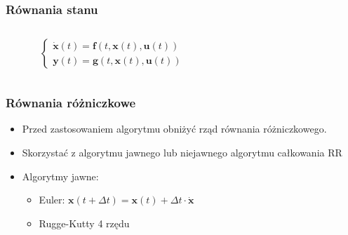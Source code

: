 \documentclass[aspectratio=169]{beamer}
\begin{document}
\begin{frame}%
	\frametitle{Równania stanu}
	\begin{columns}
		\begin{column}{0.3\textwidth}
	      		 	\uncover<1->{\[
				\begin{cases}
					\dot{\bm{x}} \left(t\right)  = \bm{Ax} \left(t\right)  + \bm{Bu} \left(t\right) \\
					\bm{y} \left(t\right) = \bm{Cx} \left(t\right) + \bm{Du} \left(t\right)
				\end{cases}
				\]}	
	      		 	\[
				\begin{cases}
					\dot{\bm{x}} \left(t\right)  = \bm{f} \left(t,\bm{x}\left(t\right),\bm{u}\left(t\right) \right) \\
					\bm{y} \left(t\right) = \bm{g} \left(t,\bm{x}\left(t\right),\bm{u}\left(t\right) \right)
				\end{cases}
				\]	
		\end{column}
		\begin{column}{0.7\textwidth}
	   	 	\begin{figure}
	   		 \centering
	    		\end{figure}
		\end{column}
	\end{columns}
\end{frame}

\begin{frame}%
	\frametitle{Równania różniczkowe}
	\begin{itemize}
	  \item{
	    Przed zastosowaniem algorytmu obniżyć rząd równania różniczkowego.
	    \pause
	  }
	  \item {   
	    Skorzystać z algorytmu jawnego lub niejawnego algorytmu całkowania RR
	    \pause
	  }
	  \item {
	    Algorytmy jawne:
	    \pause
	    \begin{itemize}
		  \item{
		    Euler: $\bm{x}\left(t + \Delta t\right) = \bm{x}\left(t\right) + \Delta t \cdot \bm{\dot{x}} $
		    \pause
		  }
		  \item {   
		    Rugge-Kutty 4 rzędu
		  }
	     \end{itemize}
	  }
 	 \end{itemize}
\end{frame}
\end{document}

